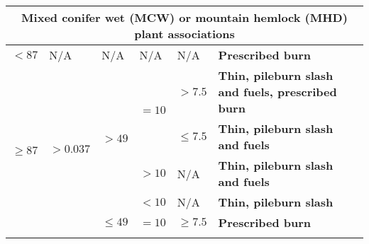 \begin{longtable}{p{.1\linewidth}p{.1\linewidth}p{.15\linewidth}p{.15\linewidth}p{.2\linewidth}p{.25\linewidth}}
\multicolumn{6}{c}{\textbf{Mixed conifer wet (MCW) or mountain hemlock (MHD) plant associations}}                                                                                                                                                                                                                                                                     \\ \hline
$<87$                       & N/A                                                    & N/A                                                 & N/A                  & N/A                                                                                                     & \textbf{Prescribed burn}                                                          \\ \hline
\multirow{7}{*}{$\ge 87$}  & \multirow{5}{*}{$>0.037$}                     & \multirow{4}{*}{$>49$}                     & \multirow{2}{*}{$=10$} & $>7.5$                                                                                         & \textbf{Thin, pileburn slash and fuels, prescribed burn}                          \\ \cline{5-6} 
                                  &                                                        &                                                     &                      & $ \le 7.5$                                                                                          & \textbf{Thin, pileburn slash and fuels}                                           \\ \cline{4-6} 
                                  &                                                        &                                                     & $>10$       & N/A                                                                                                     & \textbf{Thin, pileburn slash and fuels}                                           \\ \cline{4-6} 
                                  &                                                        &                                                     & $< 10$         & N/A                                                                                                     & \textbf{Thin, pileburn slash}                                                     \\ \cline{3-6} 
                                  &                                                        & $ \le 49$                                       & $=10$                  & $ \ge 7.5$                                                                                       & \textbf{Prescribed burn}                                                          \\ \cline{2-6} 

\end{longtable}
